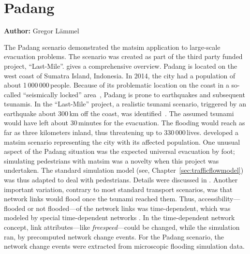\chapter{Padang}
\label{ch:padang}
\hfill \textbf{Author:} Gregor Lämmel


The Padang scenario demonstrated the \gls{matsim} application to large-scale evacuation problems. The scenario was created as part of the third party funded project, ``Last-Mile''. \citet{00TaubenboeckEtAl2012ConcludingLastMilePaperNatHazards} gives a comprehensive overview.
Padang is located on the west coast of Sumatra Island, Indonesia. In 2014, the city had a population of about 1\,000\,000\,people. 
Because of its problematic location on the coast in a so-called ``seismically locked'' area~\citep{McCloskey2010Padang2009Earthquake}, Padang is prone to earthquakes and subsequent tsunamis. In the ``Last-Mile'' project, a realistic tsunami scenario, triggered by an earthquake about 300\,km off the coast, was identified~\citep{GosebergSchlurmann2009HazardMappingPadang}. The assumed tsunami would have left about 30\,minutes for the evacuation. The flooding would reach as far as three kilometers inland, thus threatening up to 330\,000\,lives. \citet{Laemmel_PhDThesis_2011} developed a \gls{matsim} scenario representing the city with its affected population. One unusual aspect of the Padang situation was the expected universal evacuation by foot; simulating pedestrians with \gls{matsim} was a novelty when this project was undertaken. The standard simulation model (see, \eg Chapter~\ref{sec:trafficflowmodel}) was thus adapted to deal with pedestrians. 
Details were discussed in \citet{00LaemmelKluepfelNagel2009EvacPadangAtBookTimmermanns}. Another important variation, contrary to most standard transport scenarios, was that network links would flood once the tsunami reached them. Thus, accessibility---flooded or not flooded---of the network links was time-dependent, which was modeled by special time-dependent networks \citep{00LaemmelGretherNagel2009TimeDependentNetworks}. In the time-dependent network concept, link attributes---like \emph{freespeed}---could be changed, while the simulation ran, by precomputed network change events. For the Padang scenario, the network change events were extracted from microscopic flooding simulation data.

